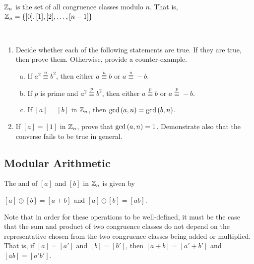 \documentclass[11pt,fleqn,dvipsnames,usenames]{article}
\newcommand{\p}{\noindent}
\begin{document}
%
\begin{definition}
$\mathbb{Z}_{n}$ is the set of all congruence classes modulo $n$.  That is, $\mathbb{Z}_{n} = \left\{[0], [1], [2],\ldots, [n-1]\right\}$.
\end{definition}
%
\begin{exercises}~
\begin{enumerate}
\item Decide whether each of the following statements are true.  If they are true, then prove them.  Otherwise, provide a counter-example.
\begin{enumerate}[(a)]
\item If $a^2\overset{n}{\equiv}b^2$, then either $a\overset{n}{\equiv}b$ or $a\overset{n}{\equiv}-b$.
\item If $p$ is prime and $a^2\overset{p}{\equiv}b^2$, then either $a\overset{p}{\equiv}b$ or $a\overset{p}{\equiv}-b$.
\item If $[a] = [b]$ in $\mathbb{Z}_{n}$, then $\text{gcd}\left(a,n\right) = \text{gcd}\left(b,n\right)$.
\end{enumerate}
\item If $[a] = [1]$ in $\mathbb{Z}_{n}$, prove that $\text{gcd}\left(a,n\right) = 1$.  Demonstrate also that the converse fails to be true in general.
\end{enumerate}
\end{exercises}
%
\subsection{Modular Arithmetic}
\begin{definition}
The  and  of $[a]$ and $[b]$ in $\mathbb{Z}_{n}$ is given by
\begin{center}
$[a]\oplus [b] = [a + b]$ and $[a]\odot[b] = [ab]$.
\end{center}
\end{definition}
%
\p Note that in order for these operations to be well-defined, it must be the case that the sum and product of two congruence classes do not depend on the representative chosen from the two congruence classes being added or multiplied.  That is, if $[a] = [a']$ and $[b] = [b']$, then $[a+b] = [a' + b']$ and $[ab] = [a'b']$.
\smsp
\end{document}
